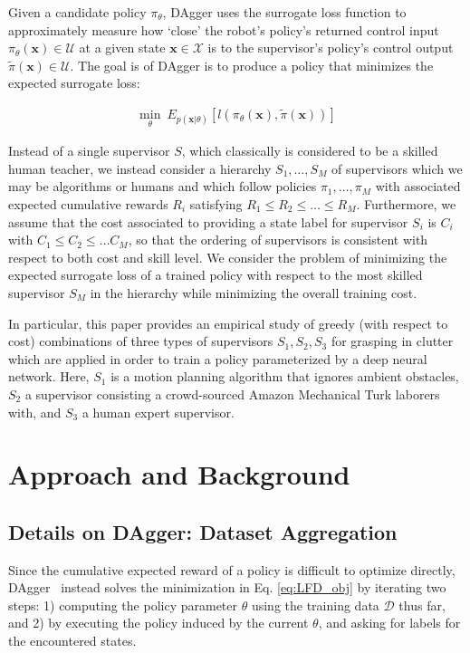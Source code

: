 \documentclass[10pt, conference]{ieeeconf}      %
\newcommand{\bx}{\mathbf{x}}
\begin{document}
Given a candidate policy $\pi_{\theta}$, DAgger uses the surrogate loss function to approximately measure how `close' the robot's policy's
returned control input $\pi_{\theta}(\bx)\in \mathcal{U}$ at a given state $\bx\in \mathcal{X}$ is to the supervisor's policy's control output
$\tilde{\pi}(\bx)\in \mathcal{U}$. The goal is of DAgger is to produce a policy that minimizes the expected surrogate loss:


 \vspace{-2ex}
\begin{align}\label{eq:LFD_obj}
\underset{\theta}{\min} \: E_{p(\bx|\theta)} [l(\pi_\theta(\bx),\tilde{\pi}(\bx))]
\end{align}

Instead of a single supervisor $S$, which classically is considered to be a skilled human teacher, we instead consider a
hierarchy $S_1, \ldots, S_M$ of supervisors which we may be algorithms or humans and which follow policies $\pi_1, \ldots, \pi_M$ with
associated expected cumulative rewards $R_i$ satisfying $R_1\le R_2 \le \ldots \le
R_M$. Furthermore, we assume that the cost associated to providing a state
label for supervisor $S_i$ is $C_i$ with $C_1\le C_2 \le \ldots C_M$, so that the ordering of supervisors is consistent
with respect to both cost and skill level. We consider the problem of minimizing the expected surrogate loss of a
trained policy with respect to the most skilled supervisor $S_M$ in the hierarchy while minimizing the overall training
cost.

In particular, this paper provides an empirical study of greedy (with respect to cost) combinations of three types of supervisors $S_1,
S_2, S_3$ for grasping in clutter which are applied in order to train a policy parameterized by a deep neural network.
Here, $S_1$ is a motion planning algorithm that ignores ambient obstacles, $S_2$ a supervisor
consisting a crowd-sourced Amazon Mechanical Turk laborers with, and $S_3$ a human expert supervisor.

\section{Approach and Background}
 \subsection{Details on DAgger: Dataset Aggregation}
Since the cumulative expected reward of a policy is difficult to optimize directly,
DAgger~\cite{ross2010reduction} instead solves the minimization in Eq. \ref{eq:LFD_obj} by iterating two steps: 1)
computing the policy parameter $\theta$ using the training data $\mathcal{D}$ thus far, and 2) by executing the policy
induced by the current $\theta$, and asking for labels for the encountered states. 
 
\end{document}
